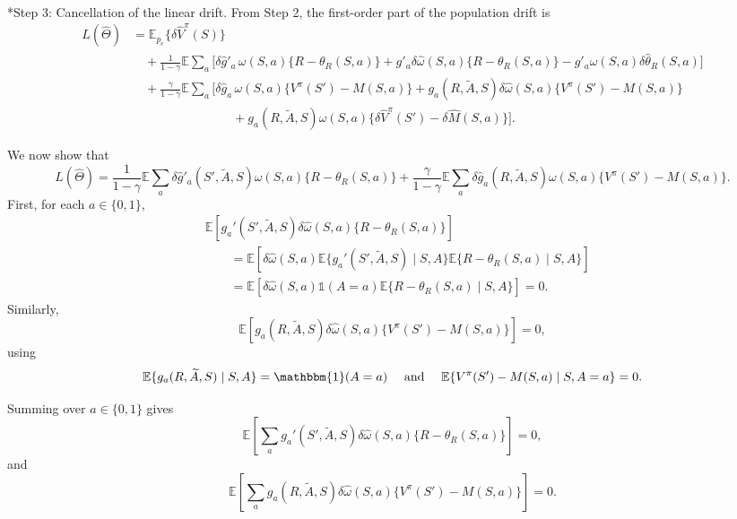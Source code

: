 \documentclass[12pt]{article}
\makeatletter
\let\oldparagraph\paragraph
\renewcommand{\paragraph}{
        \@ifstar
            \xxxParagraphStar
            \xxxParagraphNoStar
    }
\newcommand{\xxxParagraphStar}[1]{\oldparagraph*{#1}\mbox{}}
\newcommand{\xxxParagraphNoStar}[1]{\oldparagraph{#1}\mbox{}}
\newcommand{\0}{\boldsymbol{0}}
\newcommand{\E}{\mathbb{E}}
\makeatother
\begin{document}
\paragraph*{Step 3: Cancellation of the linear drift.}
From Step 2, the first-order part of the population drift is
\[
\begin{aligned}
L(\widehat\Theta)&=\E_{p_e}\{\delta \widehat V^\pi(S)\}\\
&\quad+\frac{1}{1-\gamma}\E\sum_a\Big[\delta \widehat g'_a\,\omega(S,a)\{R-\theta_R(S,a)\}+g'_a\delta \widehat \omega(S,a)\{R-\theta_R(S,a)\}-g'_a\omega(S,a)\delta \widehat \theta_R(S,a)\Big]\\
&\quad+\frac{\gamma}{1-\gamma}\E\sum_a\Big[\delta \widehat g_a\,\omega(S,a)\{V^\pi(S')-M(S,a)\}+g_a(R,\widetilde A,S)\delta \widehat \omega(S,a)\{V^\pi(S')-M(S,a)\}\\
&\qquad\qquad\qquad\qquad+g_a(R,\widetilde A,S)\omega(S,a)\{\delta \widehat V^\pi(S')-\delta \widehat M(S,a)\}\Big].
\end{aligned}
\]

We now show that 
\[
L(\widehat\Theta)= \frac{1}{1-\gamma}
\E\sum_a \delta \widehat g'_a(S',\widetilde A,S)\omega(S,a)\{R-\theta_R(S,a)\}+\frac{\gamma}{1-\gamma}\E\sum_a \delta \widehat g_a(R,\widetilde A,S)\omega(S,a)\{V^\pi(S')-M(S,a)\}.
\] 
First, for each \(a\in\{0,1\}\), 
\[
\begin{aligned}
&\mathbb{E}\left[g_a'(S',\widetilde A,S)\delta\widehat{\omega}(S,a)\{R-\theta_R(S,a)\}\right] \\
&\qquad=\mathbb{E}\left[\delta\widehat{\omega}(S,a)
\mathbb{E}\{g_a'(S',\widetilde A,S)\mid S,A\}\mathbb{E}\{R-\theta_R(S,a)\mid S,A\}\right]\\
&\qquad=\mathbb{E}\left[\delta\widehat{\omega}(S,a)
\mathds{1}(A=a)\mathbb{E}\{R-\theta_R(S,a)\mid S,A\}\right] = 0.
\end{aligned}
\]
Similarly,
\[
\mathbb{E}\left[
g_a(R,\widetilde A,S)\delta\widehat{\omega}(S,a)\{V^\pi(S')-M(S,a)\}\right]=0,
\]
using
\[
\mathbb{E}\{g_a(R,\widetilde A,S)\mid S,A\}=\mathbbm{1}(A=a)
\quad\text{ and }\quad
\mathbb{E}\{V^\pi(S')-M(S,a)\mid S,A=a\}=0.
\]

Summing over \(a\in\{0,1\}\) gives
\[
\mathbb{E}\left[\sum_ag_a'(S',\widetilde A,S)\delta\widehat{\omega}(S,a)\{R-\theta_R(S,a)\}\right]=0,
\]
and
\[
\mathbb{E}\left[\sum_ag_a(R,\widetilde A,S)\delta\widehat{\omega}(S,a)\{V^\pi(S')-M(S,a)\}\right]=0.
\]
\end{document}
